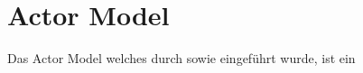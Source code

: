 \chapter{Actor Model}
Das Actor Model welches durch \cite{hewitt1973session} sowie \cite{Agha1985Actors:Systems.} eingeführt wurde, ist ein